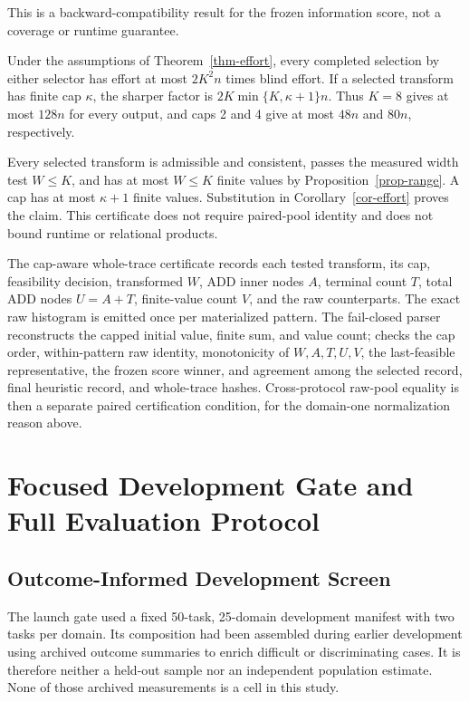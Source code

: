 This is a backward-compatibility result for the frozen information score, not
a coverage or runtime guarantee.

\begin{corollary}
\label{cor-selector-safety}
Under the assumptions of Theorem~\ref{thm-effort}, every completed selection
by either selector has effort at most $2K^2n$ times blind effort. If a selected
transform has finite cap $\kappa$, the sharper factor is
$2K\min\{K,\kappa+1\}n$. Thus $K=8$ gives at most $128n$ for every output,
and caps 2 and 4 give at most $48n$ and $80n$, respectively.
\end{corollary}

Every selected transform is admissible and consistent, passes the measured
width test $W\leq K$, and has at most $W\leq K$ finite values by
Proposition~\ref{prop-range}. A cap has at most $\kappa+1$ finite values.
Substitution in Corollary~\ref{cor-effort} proves the claim. This certificate
does not require paired-pool identity and does not bound runtime or relational
products.

The cap-aware whole-trace certificate records each tested transform, its cap,
feasibility decision, transformed \(W\), ADD inner nodes \(A\), terminal count
\(T\), total ADD nodes \(U=A+T\), finite-value count \(V\), and the raw
counterparts.  The exact raw histogram is emitted once per materialized
pattern.  The fail-closed parser reconstructs the capped initial value, finite
sum, and value count; checks the cap order, within-pattern raw identity,
monotonicity of \(W,A,T,U,V\), the last-feasible representative, the frozen
score winner, and agreement among the selected record, final heuristic record,
and whole-trace hashes.  Cross-protocol raw-pool equality is then a separate
paired certification condition, for the domain-one normalization reason above.

\section{Focused Development Gate and Full Evaluation Protocol}
\label{sec:supp-cap-protocol}

\subsection{Outcome-Informed Development Screen}

The launch gate used a fixed 50-task, 25-domain development manifest with two
tasks per domain.  Its composition had been assembled during earlier
development using archived outcome summaries to enrich difficult or
discriminating cases.  It is therefore neither a held-out sample nor an
independent population estimate.  None of those archived measurements is a
cell in this study.

